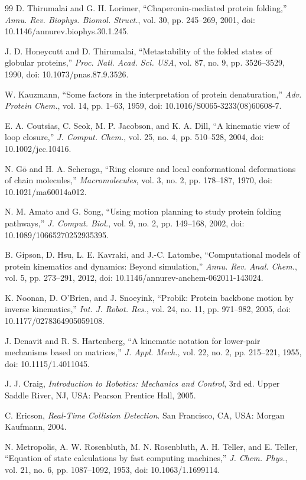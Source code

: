 \documentclass[10pt,conference]{IEEEtran}
\begin{document}
\begin{thebibliography}{99}
D. Thirumalai and G. H. Lorimer, ``Chaperonin-mediated protein folding,''
\emph{Annu. Rev. Biophys. Biomol. Struct.}, vol. 30, pp. 245--269, 2001,
doi: 10.1146/annurev.biophys.30.1.245.

J. D. Honeycutt and D. Thirumalai, ``Metastability of the folded states of
globular proteins,'' \emph{Proc. Natl. Acad. Sci. USA}, vol. 87, no. 9,
pp. 3526--3529, 1990, doi: 10.1073/pnas.87.9.3526.

W. Kauzmann, ``Some factors in the interpretation of protein denaturation,''
\emph{Adv. Protein Chem.}, vol. 14, pp. 1--63, 1959,
doi: 10.1016/S0065-3233(08)60608-7.

E. A. Coutsias, C. Seok, M. P. Jacobson, and K. A. Dill, ``A kinematic view of
loop closure,'' \emph{J. Comput. Chem.}, vol. 25, no. 4, pp. 510--528, 2004,
doi: 10.1002/jcc.10416.

N. G\=o and H. A. Scheraga, ``Ring closure and local conformational deformations
of chain molecules,'' \emph{Macromolecules}, vol. 3, no. 2, pp. 178--187, 1970,
doi: 10.1021/ma60014a012.

N. M. Amato and G. Song, ``Using motion planning to study protein folding
pathways,'' \emph{J. Comput. Biol.}, vol. 9, no. 2, pp. 149--168, 2002,
doi: 10.1089/10665270252935395.

B. Gipson, D. Hsu, L. E. Kavraki, and J.-C. Latombe, ``Computational models of
protein kinematics and dynamics: Beyond simulation,'' \emph{Annu. Rev. Anal.
Chem.}, vol. 5, pp. 273--291, 2012, doi: 10.1146/annurev-anchem-062011-143024.

K. Noonan, D. O'Brien, and J. Snoeyink, ``Probik: Protein backbone motion by
inverse kinematics,'' \emph{Int. J. Robot. Res.}, vol. 24, no. 11, pp. 971--982,
2005, doi: 10.1177/0278364905059108.

J. Denavit and R. S. Hartenberg, ``A kinematic notation for lower-pair mechanisms
based on matrices,'' \emph{J. Appl. Mech.}, vol. 22, no. 2, pp. 215--221, 1955,
doi: 10.1115/1.4011045.

J. J. Craig, \emph{Introduction to Robotics: Mechanics and Control}, 3rd ed.
Upper Saddle River, NJ, USA: Pearson Prentice Hall, 2005.

C. Ericson, \emph{Real-Time Collision Detection}. San Francisco, CA, USA: Morgan
Kaufmann, 2004.

N. Metropolis, A. W. Rosenbluth, M. N. Rosenbluth, A. H. Teller, and E. Teller,
``Equation of state calculations by fast computing machines,'' \emph{J. Chem.
Phys.}, vol. 21, no. 6, pp. 1087--1092, 1953, doi: 10.1063/1.1699114.


\end{thebibliography}
\end{document}
